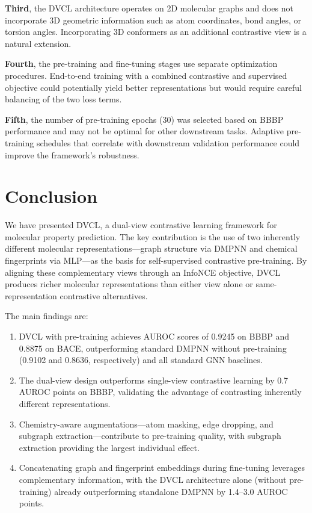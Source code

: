 \documentclass[a4paper,fleqn]{cas-sc}
\begin{document}
\textbf{Third}, the DVCL architecture operates on 2D molecular graphs and does not incorporate 3D geometric information such as atom coordinates, bond angles, or torsion angles. Incorporating 3D conformers as an additional contrastive view is a natural extension.

\textbf{Fourth}, the pre-training and fine-tuning stages use separate optimization procedures. End-to-end training with a combined contrastive and supervised objective could potentially yield better representations but would require careful balancing of the two loss terms.

\textbf{Fifth}, the number of pre-training epochs (30) was selected based on BBBP performance and may not be optimal for other downstream tasks. Adaptive pre-training schedules that correlate with downstream validation performance could improve the framework's robustness.


\section{Conclusion}\label{sec:conclusion}

We have presented DVCL, a dual-view contrastive learning framework for molecular property prediction. The key contribution is the use of two inherently different molecular representations---graph structure via DMPNN and chemical fingerprints via MLP---as the basis for self-supervised contrastive pre-training. By aligning these complementary views through an InfoNCE objective, DVCL produces richer molecular representations than either view alone or same-representation contrastive alternatives.

The main findings are:

\begin{enumerate}
\item DVCL with pre-training achieves AUROC scores of 0.9245 on BBBP and 0.8875 on BACE, outperforming standard DMPNN without pre-training (0.9102 and 0.8636, respectively) and all standard GNN baselines.

\item The dual-view design outperforms single-view contrastive learning by 0.7 AUROC points on BBBP, validating the advantage of contrasting inherently different representations.

\item Chemistry-aware augmentations---atom masking, edge dropping, and subgraph extraction---contribute to pre-training quality, with subgraph extraction providing the largest individual effect.

\item Concatenating graph and fingerprint embeddings during fine-tuning leverages complementary information, with the DVCL architecture alone (without pre-training) already outperforming standalone DMPNN by 1.4--3.0 AUROC points.
\end{enumerate}
\end{document}
